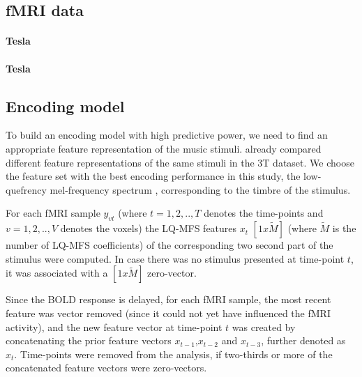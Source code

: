 \cite{HBI+14,HDH+2015}

\subsection*{fMRI data}

\paragraph{\unit[3]{Tesla}}
\paragraph{\unit[7]{Tesla}}

\subsection*{Encoding model}

To build an encoding model with high predictive power, we need to find an
appropriate feature representation of the music stimuli. \cite{CTK+2012} already
compared different feature representations of the same stimuli in the 3T
dataset. We choose the feature set with the best encoding performance in this
study, the low-quefrency mel-frequency spectrum \cite{HDH+2015}, corresponding to the timbre of the stimulus. 



For each f{MRI} sample $y_{vt}$ (where $t=1,2,..,T$ denotes the time-points and $v=1,2,..,V$ denotes the voxels) the LQ-MFS features $x_{t}$ $[1x\widetilde{M}]$ (where $\widetilde{M}$ is the number of LQ-MFS coefficients) of the corresponding two second part of the stimulus were computed. In case there was no stimulus presented at time-point $t$, it was associated with a $[1x\widetilde{M}]$ zero-vector. 

Since the BOLD response is delayed, for each f{MRI} sample, the most recent feature was vector removed (since it could not yet have influenced the f{MRI} activity), and the new feature vector at time-point $t$ was created by concatenating the prior feature vectors $x_{t-1}$,$x_{t-2}$ and $x_{t-3}$, further denoted as $x_{t}$. Time-points were removed from the analysis, if two-thirds or more of the concatenated feature vectors were zero-vectors.

